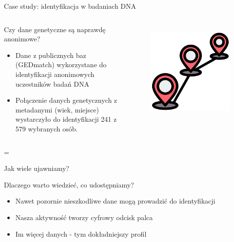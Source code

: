   
  \begin{frame}{Case study: identyfikacja w badaniach DNA}
  \begin{columns}[c]
      \begin{alertblock}{Czy dane genetyczne są naprawdę anonimowe?}
        \begin{itemize}
          \item Dane z publicznych baz (GEDmatch) wykorzystane do identyfikacji anonimowych uczestników badań DNA
          \item Połączenie danych genetycznych z metadanymi (wiek, miejsce) wystarczyło do identyfikacji 241 z 579 wybranych osób.\cite{DNA_LEAK}
        \end{itemize}
      \end{alertblock}
      \begin{figure}
        \centering
        \includegraphics[height=0.45\textheight]{images/routing.png}
        \label{fig:dnaCase}
      \end{figure}
  \end{columns}=
  \end{frame}
  
  
  \begin{frame}{Jak wiele ujawniamy?}
    \begin{alertblock}{Dlaczego warto wiedzieć, co udostępniamy?}
      \begin{itemize}
        \item Nawet pozornie nieszkodliwe dane mogą prowadzić do identyfikacji
        \item Nasza aktywność tworzy cyfrowy odcisk palca
        \item Im więcej danych - tym dokładniejszy profil
      \end{itemize}
    \end{alertblock}
  \end{frame}